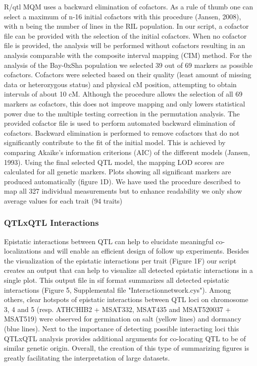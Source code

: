 \documentclass[8pt, twoside, a5paper]{report}
\begin{document}
R/qtl MQM uses a backward elimination of cofactors. As a rule of thumb one can select a maximum of n-16 initial cofactors with this procedure (Jansen, 2008), with n
being the number of lines in the RIL population. In our script, a cofactor file can be provided with the selection of the initial cofactors. When no cofactor file is provided, the
analysis will be performed without cofactors resulting in an analysis comparable with the composite interval mapping (CIM) method. For the analysis of the Bay-0xSha population
we selected 39 out of 69 markers as possible cofactors. Cofactors were selected based on their quality (least amount of missing data or heterozygous status) and physical cM
position, attempting to obtain intervals of about 10 cM. Although the procedure allows the selection of all 69 markers as cofactors, this does not improve mapping and only lowers
statistical power due to the multiple testing correction in the permutation analysis. The provided cofactor file is used to perform automated backward elimination of cofactors.
Backward elimination is performed to remove cofactors that do not significantly contribute to the fit of the initial model. This is achieved by comparing Akaike's information criterions
(AIC) of the different models (Jansen, 1993). Using the final selected QTL model, the mapping LOD scores are calculated for all genetic markers. Plots showing all significant
markers are produced automatically (figure 1D). We have used the procedure described to map all 327 individual measurements but to enhance
readability we only show average values for each trait (94 traits)

\subsubsection{QTLxQTL Interactions}
Epistatic interactions between QTL can help to elucidate meaningful co-localizations and will enable an efficient design of follow up experiments. Besides the
visualization of the epistatic interactions per trait (Figure 1F) our script creates an output that can help to visualize all detected epistatic interactions in a single plot. This output file
in sif format summarizes all detected epistatic interactions (Figure 5, Supplemental file "Interactionnetwork.cys"). Among others, clear hotspots of epistatic interactions between
QTL loci on chromosome 3, 4 and 5 (resp. ATHCHIB2 + MSAT332, MSAT435 and MSAT520037 + MSAT519) were observed for germination on salt (yellow lines) and
dormancy (blue lines). Next to the importance of detecting possible interacting loci this QTLxQTL analysis provides additional arguments for co-locating QTL to be of similar
genetic origin. Overall, the creation of this type of summarizing figures is greatly facilitating the interpretation of large datasets.
\end{document}
